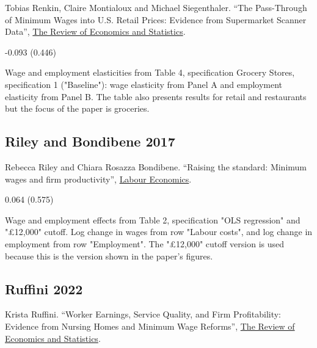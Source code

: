 \noindent Tobias Renkin, Claire Montialoux and Michael Siegenthaler. ``The Pass-Through of Minimum Wages into U.S. Retail Prices: Evidence from Supermarket Scanner Data'', \href{https://doi.org/10.1162/rest_a_00981}{The Review of Economics and Statistics}.

\vspace{0.7em}

 -0.093 (0.446)

\vspace{0.7em}

 Wage and employment elasticities from Table 4, specification Grocery Stores, specification 1 ("Baseline"): wage elasticity from Panel A and employment elasticity from Panel B. The table also presents results for retail and restaurants but the focus of the paper is groceries.

\subsection*{Riley and Bondibene 2017}
\vspace{-0.7em}

\noindent Rebecca Riley and Chiara Rosazza Bondibene. ``Raising the standard: Minimum wages and ﬁrm productivity'', \href{http://dx.doi.org/10.1016/j.labeco.2016.11.010}{Labour Economics}.

\vspace{0.7em}

 0.064 (0.575)

\vspace{0.7em}

 Wage and employment effects from Table 2, specification "OLS regression" and "£12,000" cutoff. Log change in wages from row "Labour costs", and log change in employment from row "Employment". The "£12,000" cutoff version is used because this is the version shown in the paper's figures.

\subsection*{Ruffini 2022}
\vspace{-0.7em}

\noindent Krista Ruffini. ``Worker Earnings, Service Quality, and Firm Profitability: Evidence from Nursing Homes and Minimum Wage Reforms'', \href{https://doi.org/10.1162/rest_a_01271}{The Review of Economics and Statistics}.

